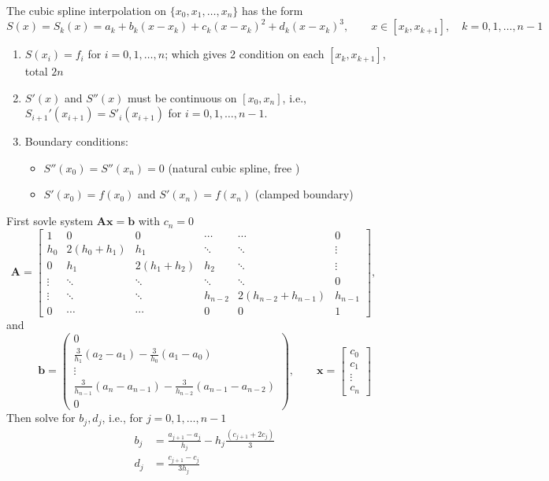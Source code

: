\begin{definition}
The cubic spline interpolation on $\{x_0,x_1,\dots,x_n\}$ has the form
\[
S(x)=S_k(x)=a_k+b_k(x-x_k)+c_k(x-x_k)^2+d_k(x-x_k)^3,\qquad
x\in[x_k,x_{k+1}],\quad k=0,1,\dots,n-1
\]
\begin{enumerate}
\item
$S(x_i)=f_i$ for $i=0,1,\dots,n$; which gives 2 condition on each $[x_k,x_{k+1}]$, total $2n$
\item
$S'(x)$ and $S''(x)$ must be continuous on $[x_0,x_n]$, i.e., $S_{i+1}'(x_{i+1})=S'_i(x_{i+1})$ for $i=0,1,\dots,n-1$.
\item
Boundary conditions:
\begin{itemize}
\item
$S''(x_0)=S''(x_n)=0$  (natural cubic spline, free )
\item
$S'(x_0)=f(x_0)$ and $S'(x_n) = f(x_n)$ (clamped boundary)
\end{itemize}
\end{enumerate}
\end{definition}

\clearpage

\begin{definition}
First sovle system $\bm{Ax}=\bm b$ with $c_n=0$
\[
\bm A=\begin{bmatrix}
1&0&0&\cdots&\cdots&0\\
h_0&2(h_0+h_1)&h_1&\ddots&\ddots&\vdots\\
0&h_1&2(h_1+h_2)&h_2&\ddots&\vdots\\
\vdots&\ddots&\ddots&\ddots&\ddots&0\\
\vdots&\ddots&\ddots&h_{n-2}&2(h_{n-2}+h_{n-1})&h_{n-1}\\
0&\cdots&\cdots&0&0&1
\end{bmatrix},\qquad
\]
and
\[
\bm b=\begin{pmatrix}
0\\\frac{3}{h_1}(a_2-a_1)-\frac{3}{h_0}(a_1-a_0)\\
\vdots\\
\frac{3}{h_{n-1}}(a_{n}-a_{n-1})-\frac{3}{h_{n-2}}(a_{n-1}-a_{n-2})\\0
\end{pmatrix},\qquad
\bm x=\begin{bmatrix}
c_0\\c_1\\\vdots\\c_n
\end{bmatrix}
\]
Then solve for $b_j,d_j$, i.e., for $j=0,1,\dots,n-1$
\begin{align*}
b_j&=\frac{a_{j+1}-a_j}{h_j}-h_j\frac{(c_{j+1}+2c_j)}{3}\\
d_j&=\frac{c_{j+1}-c_j}{3h_j}
\end{align*}
\end{definition}

